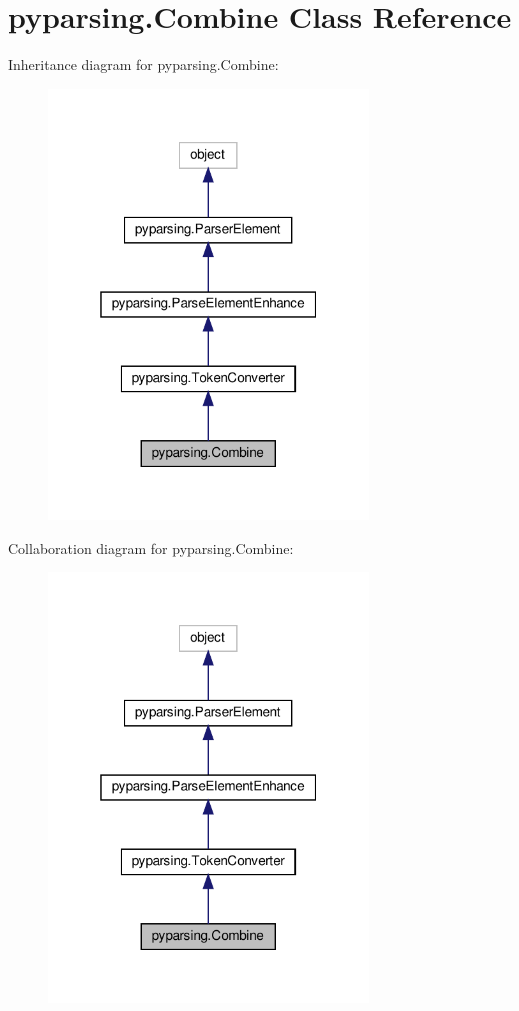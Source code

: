 \hypertarget{classpyparsing_1_1Combine}{}\section{pyparsing.\+Combine Class Reference}
\label{classpyparsing_1_1Combine}


Inheritance diagram for pyparsing.\+Combine\+:
\nopagebreak
\begin{figure}[H]
\begin{center}
\leavevmode
\includegraphics[width=241pt]{classpyparsing_1_1Combine__inherit__graph}
\end{center}
\end{figure}


Collaboration diagram for pyparsing.\+Combine\+:
\nopagebreak
\begin{figure}[H]
\begin{center}
\leavevmode
\includegraphics[width=241pt]{classpyparsing_1_1Combine__coll__graph}
\end{center}
\end{figure}
